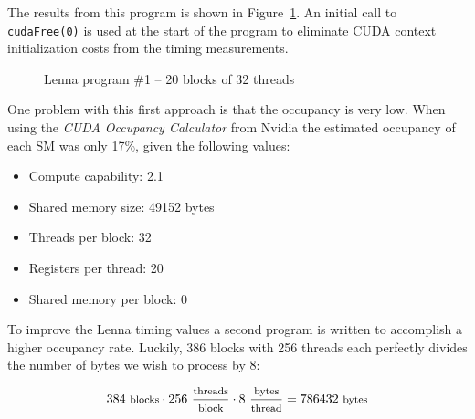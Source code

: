 \begin{enumerate}
The results from this program is shown in Figure~\ref{figure:lenna_1}. An initial call to \texttt{cudaFree(0)} is used at the start of the program to eliminate \ac{CUDA} context initialization costs from the timing measurements.

\begin{figure}
\caption{Lenna program \#1 -- 20 blocks of 32 threads}
\label{figure:lenna_1}
\end{figure}

One problem with this first approach is that the occupancy is very low. When using the \textit{CUDA Occupancy Calculator} from Nvidia the estimated occupancy of each \ac{SM} was only 17\%, given the following values:

\begin{itemize}
\item Compute capability: 2.1
\item Shared memory size: 49152 bytes
\item Threads per block: 32
\item Registers per thread: 20
\item Shared memory per block: 0
\end{itemize}

To improve the Lenna timing values a second program is written to accomplish a higher occupancy rate. Luckily, 386 blocks with 256 threads each perfectly divides the number of bytes we wish to process by 8:

\begin{displaymath}
384~\text{\footnotesize blocks} \cdot 256~\frac{\text{\footnotesize threads}}{\text{\footnotesize block}} \cdot 8~\frac{\text{\footnotesize bytes}}{\text{\footnotesize thread}} = 786432~\text{\footnotesize bytes}
\end{displaymath}


\end{enumerate}
